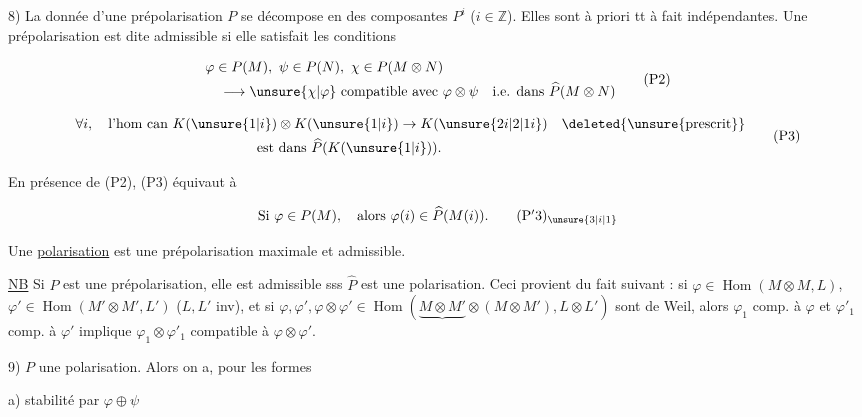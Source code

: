 
8)  La donnée d'une prépolarisation $P$ se décompose en des composantes $P^i$ ($i\in\mathbb Z$). Elles sont à priori tt à fait indépendantes. Une prépolarisation est dite admissible si elle satisfait les conditions

\[
\begin{aligned}
&\varphi\in P(M),\ \psi\in P(N),\ \chi\in P(M\otimes N)\\
&\quad\longrightarrow\unsure{\chi|\varphi}\ \text{compatible avec }\varphi\otimes\psi\quad\text{i.e. dans }\widehat P(M\otimes N)
\end{aligned}\tag*{(P2)}
\]

\[
\begin{aligned}
&\forall i,\quad\text{l'hom can }K(\unsure{1|i})\otimes K(\unsure{1|i})\to K(\unsure{2i|2|1i})\quad\deleted{\text{\unsure{prescrit}}}\\
&\hspace{13em}\text{est dans }\widehat P(K(\unsure{1|i})).
\end{aligned}\tag*{(P3)}
\]

En présence de (P2), (P3) équivaut à


\[
\text{Si }\varphi\in P(M),\quad\text{alors }\varphi(i)\in\widehat P(M(i)).\tag*{$(\mathrm P'3)_{\unsure{3|i|1}}$}
\]


Une \uline{polarisation} est une prépolarisation maximale et admissible.

\uline{NB} Si $P$ est une prépolarisation, elle est admissible sss $\widehat P$ est une polarisation. Ceci provient du fait suivant : si $\varphi\in\operatorname{Hom}(M\otimes M,L)$, $\varphi'\in\operatorname{Hom}(M'\otimes M',L')$ ($L,L'$ inv), et si $\varphi,\varphi',\varphi\otimes\varphi'\in\operatorname{Hom}(\underbrace{M\otimes M'}\otimes(M\otimes M'),L\otimes L')$ sont de Weil, alors $\varphi_1$ comp. à $\varphi$ et $\varphi'_1$ comp. à $\varphi'$ implique $\varphi_1\otimes\varphi'_1$ compatible à $\varphi\otimes\varphi'$.


9)  $P$ une polarisation. Alors on a, pour les formes 

a) stabilité par $\varphi\oplus\psi$ 

